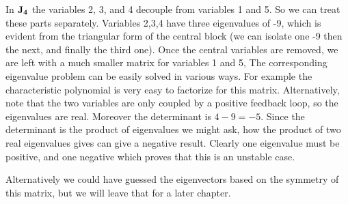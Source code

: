 In $\bf J_4$ the variables 2, 3, and 4 decouple from variables 1 and 5. So we can treat these parts separately. Variables 2,3,4 have three eigenvalues of -9, which is evident from the triangular form of the central block (we can isolate one -9 then the next, and finally the third one). Once the central variables are removed, we are left with a much smaller matrix for variables 1 and 5, 
The corresponding eigenvalue problem can be easily solved in various ways. For example the characteristic polynomial is very easy to factorize for this matrix. Alternatively, note that the two variables are only coupled by a positive feedback loop, so the eigenvalues are real. Moreover the determinant is $4-9=-5$. Since the determinant is the product of eigenvalues we might ask, how the product of two real eigenvalues gives can give a  negative result. Clearly one eigenvalue must be positive, and one negative which proves that this is an unstable case. 

Alternatively we could have guessed the eigenvectors based on the symmetry of this matrix, but we will leave that for a later chapter.
